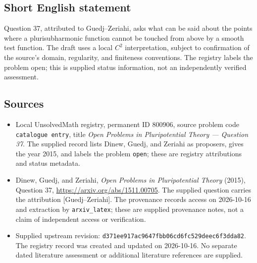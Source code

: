 \documentclass[11pt]{article}
\begin{document}
\subsection{Short English statement}
Question 37, attributed to Guedj--Zeriahi, asks what can be said about the points where a plurisubharmonic function cannot be touched from above by a smooth test function. The draft uses a local \(C^2\) interpretation, subject to confirmation of the source's domain, regularity, and finiteness conventions. The registry labels the problem open; this is supplied status information, not an independently verified assessment.
\subsection{Sources}
\begin{itemize}
\item Local UnsolvedMath registry, permanent ID \(800906\), source problem code \texttt{catalogue entry}, title \emph{Open Problems in Pluripotential Theory --- Question 37}. The supplied record lists Dinew, Guedj, and Zeriahi as proposers, gives the year 2015, and labels the problem \texttt{open}; these are registry attributions and status metadata.
\item Dinew, Guedj, and Zeriahi, \emph{Open Problems in Pluripotential Theory} (2015), Question 37, \url{https://arxiv.org/abs/1511.00705}. The supplied question carries the attribution \textnormal{[Guedj--Zeriahi]}. The provenance records access on 2026-10-16 and extraction by \texttt{arxiv\_latex}; these are supplied provenance notes, not a claim of independent access or verification.
\item Supplied upstream revision: \texttt{d371ee917ac9647fbb06cd6fc529deec6f3dda82}. The registry record was created and updated on 2026-10-16. No separate dated literature assessment or additional literature references are supplied.
\end{itemize}
\end{document}
